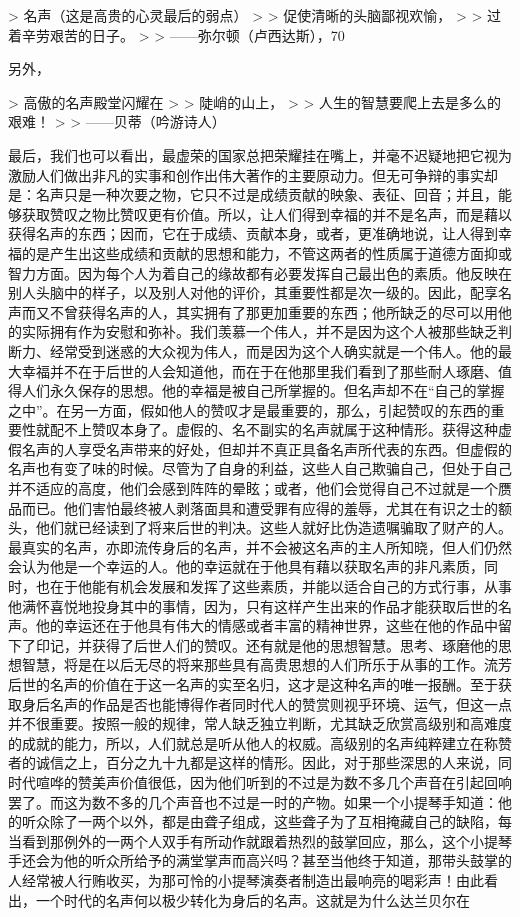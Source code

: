 \documentclass[12pt,oneside]{book}
\begin{document}
> 名声（这是高贵的心灵最后的弱点） 
>
> 促使清晰的头脑鄙视欢愉， 
>
> 过着辛劳艰苦的日子。 
>
> ——弥尔顿（卢西达斯），70 

 

另外， 

 

> 高傲的名声殿堂闪耀在 
>
> 陡峭的山上，
>
> 人生的智慧要爬上去是多么的艰难！ 
>
> ——贝蒂（吟游诗人） 

 

最后，我们也可以看出，最虚荣的国家总把荣耀挂在嘴上，并毫不迟疑地把它视为激励人们做出非凡的实事和创作出伟大著作的主要原动力。但无可争辩的事实却是：名声只是一种次要之物，它只不过是成绩贡献的映象、表征、回音；并且，能够获取赞叹之物比赞叹更有价值。所以，让人们得到幸福的并不是名声，而是藉以获得名声的东西；因而，它在于成绩、贡献本身，或者，更准确地说，让人得到幸福的是产生出这些成绩和贡献的思想和能力，不管这两者的性质属于道德方面抑或智力方面。因为每个人为着自己的缘故都有必要发挥自己最出色的素质。他反映在别人头脑中的样子，以及别人对他的评价，其重要性都是次一级的。因此，配享名声而又不曾获得名声的人，其实拥有了那更加重要的东西；他所缺乏的尽可以用他的实际拥有作为安慰和弥补。我们羡慕一个伟人，并不是因为这个人被那些缺乏判断力、经常受到迷惑的大众视为伟人，而是因为这个人确实就是一个伟人。他的最大幸福并不在于后世的人会知道他，而在于在他那里我们看到了那些耐人琢磨、值得人们永久保存的思想。他的幸福是被自己所掌握的。但名声却不在“自己的掌握之中”。在另一方面，假如他人的赞叹才是最重要的，那么，引起赞叹的东西的重要性就配不上赞叹本身了。虚假的、名不副实的名声就属于这种情形。获得这种虚假名声的人享受名声带来的好处，但却并不真正具备名声所代表的东西。但虚假的名声也有变了味的时候。尽管为了自身的利益，这些人自己欺骗自己，但处于自己并不适应的高度，他们会感到阵阵的晕眩；或者，他们会觉得自己不过就是一个赝品而已。他们害怕最终被人剥落面具和遭受罪有应得的羞辱，尤其在有识之士的额头，他们就已经读到了将来后世的判决。这些人就好比伪造遗嘱骗取了财产的人。最真实的名声，亦即流传身后的名声，并不会被这名声的主人所知晓，但人们仍然会认为他是一个幸运的人。他的幸运就在于他具有藉以获取名声的非凡素质，同时，也在于他能有机会发展和发挥了这些素质，并能以适合自己的方式行事，从事他满怀喜悦地投身其中的事情，因为，只有这样产生出来的作品才能获取后世的名声。他的幸运还在于他具有伟大的情感或者丰富的精神世界，这些在他的作品中留下了印记，并获得了后世人们的赞叹。还有就是他的思想智慧。思考、琢磨他的思想智慧，将是在以后无尽的将来那些具有高贵思想的人们所乐于从事的工作。流芳后世的名声的价值在于这一名声的实至名归，这才是这种名声的唯一报酬。至于获取身后名声的作品是否也能博得作者同时代人的赞赏则视乎环境、运气，但这一点并不很重要。按照一般的规律，常人缺乏独立判断，尤其缺乏欣赏高级别和高难度的成就的能力，所以，人们就总是听从他人的权威。高级别的名声纯粹建立在称赞者的诚信之上，百分之九十九都是这样的情形。因此，对于那些深思的人来说，同时代喧哗的赞美声价值很低，因为他们听到的不过是为数不多几个声音在引起回响罢了。而这为数不多的几个声音也不过是一时的产物。如果一个小提琴手知道：他的听众除了一两个以外，都是由聋子组成，这些聋子为了互相掩藏自己的缺陷，每当看到那例外的一两个人双手有所动作就跟着热烈的鼓掌回应，那么，这个小提琴手还会为他的听众所给予的满堂掌声而高兴吗？甚至当他终于知道，那带头鼓掌的人经常被人行贿收买，为那可怜的小提琴演奏者制造出最响亮的喝彩声！由此看出，一个时代的名声何以极少转化为身后的名声。这就是为什么达兰贝尔在
\end{document}
